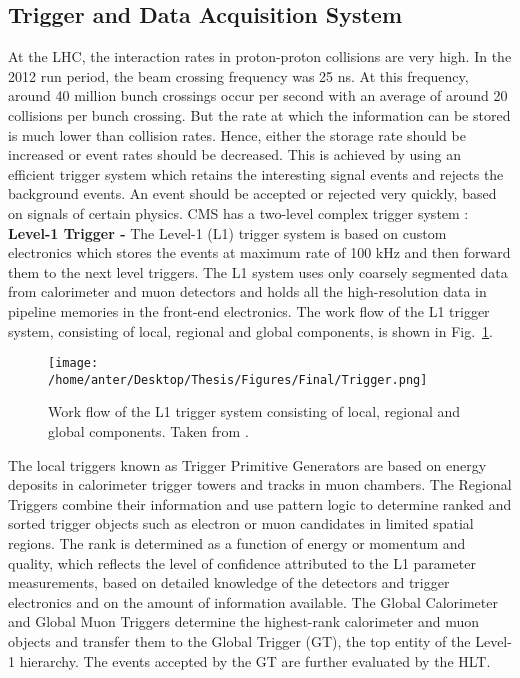 \subsection{Trigger and Data Acquisition System}
At the LHC, the interaction rates in proton-proton collisions are very high. In the 2012 run period, the beam crossing frequency was 25 ns. At this frequency, around 40 million bunch crossings occur per second with an average of around 20 collisions per bunch crossing. But the rate at which the information can be stored is much lower than collision rates. Hence, either the storage rate should be increased or event rates should be decreased. This is achieved by using an efficient trigger system which retains the interesting signal events and rejects the background events. An event should be accepted or rejected very quickly, based on signals of certain physics.
CMS has a two-level complex trigger system : \\\newline
{\bf Level-1 Trigger -} The Level-1 (L1) trigger system is based on custom electronics which stores the events at maximum rate of 100 kHz and then forward them to the next level triggers. The L1 system uses only coarsely segmented data from calorimeter and muon detectors and holds all the high-resolution data in pipeline memories in the front-end electronics. The work flow of the L1 trigger system, consisting of local, regional and global components, is shown in Fig.~\ref{fig:L1}.
\begin{figure}[!h]
\begin{center}
\vspace*{3mm} 
\hspace*{-5mm}
\texttt{[image: /home/anter/Desktop/Thesis/Figures/Final/Trigger.png]}\\
\vspace*{4mm}
\caption[Work flow of the L1 trigger system consisting of local, regional and global components.]{Work flow of the L1 trigger system consisting of local, regional and global components. Taken from \cite{Chatrchyan:2008aa}.}
\label{fig:L1}
\end{center}
\end{figure}
The local triggers known as Trigger Primitive Generators are based on energy deposits in calorimeter trigger towers and tracks in muon chambers. The Regional Triggers combine their information and use pattern logic to determine ranked and sorted trigger objects such as electron or muon candidates in limited spatial regions. The rank is determined as a function of energy or momentum and quality, which reflects the level of confidence attributed to the L1 parameter measurements, based on detailed knowledge of the detectors and trigger electronics and on the amount of information available. The Global Calorimeter and Global Muon Triggers determine the highest-rank calorimeter and muon objects and transfer them to the Global Trigger (GT), the top entity of the Level-1 hierarchy. The events accepted by the GT are further evaluated by the HLT. \\\newline
